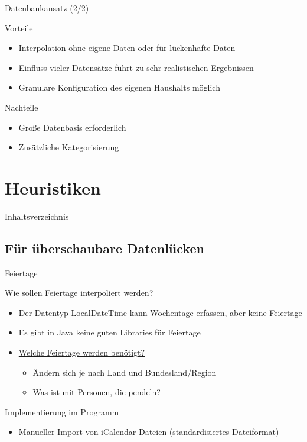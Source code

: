 \begin{frame}{Datenbankansatz (2/2)}
\begin{block}{Vorteile}
\begin{itemize}
	\item Interpolation ohne eigene Daten oder für lückenhafte Daten
	\item Einfluss vieler Datensätze führt zu sehr realistischen Ergebnissen
	\item Granulare Konfiguration des eigenen Haushalts möglich
\end{itemize}
\end{block}
\begin{block}{Nachteile}
\begin{itemize}
	\item Große Datenbasis erforderlich
	\item Zusätzliche Kategorisierung
\end{itemize}
\end{block}
\end{frame}

\section{Heuristiken}
\begin{frame}{Inhaltsverzeichnis}
\tableofcontents[currentsection]
\end{frame}

\subsection{Für überschaubare Datenlücken}
\begin{frame}{Feiertage}
\begin{block}{Wie sollen Feiertage interpoliert werden?}
\begin{itemize}
\item Der Datentyp LocalDateTime kann Wochentage erfassen, aber keine Feiertage
\item Es gibt in Java keine guten Libraries für Feiertage
\item \underline{Welche Feiertage werden benötigt?}
\begin{itemize}
\item Ändern sich je nach Land und Bundesland/Region
\item Was ist mit Personen, die pendeln?
\end{itemize}
\end{itemize}
\end{block}
\begin{block}{Implementierung im Programm}
\begin{itemize}
\item Manueller Import von iCalendar-Dateien (standardisiertes Dateiformat)
\end{itemize}
\end{block}
\end{frame}

